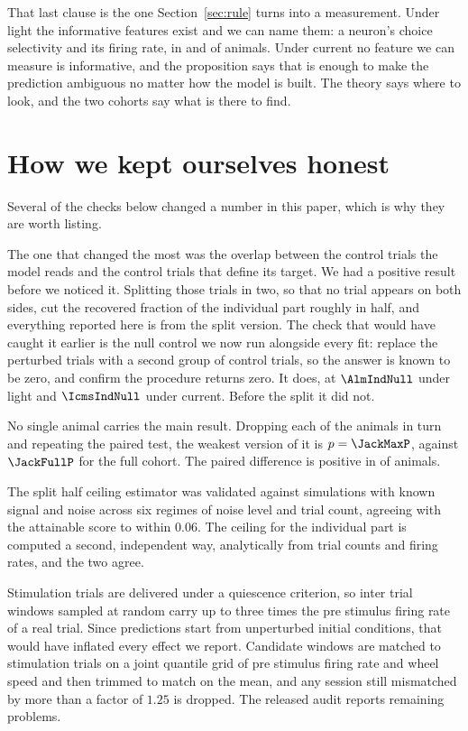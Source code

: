 \documentclass[11pt,letterpaper]{article}
\begin{document}
That last clause is the one Section~\ref{sec:rule} turns into a measurement. Under
light the informative features exist and we can name them: a neuron's choice
selectivity and its firing rate, in \RuleSelNeg{} and \RuleRateNeg{} of \RuleSelN{}
animals. Under current no feature we can measure is informative, and the proposition
says that is enough to make the prediction ambiguous no matter how the model is built.
The theory says where to look, and the two cohorts say what is there to find.

\section{How we kept ourselves honest}

Several of the checks below changed a number in this paper, which is why they are worth
listing.

The one that changed the most was the overlap between the control trials the model
reads and the control trials that define its target. We had a positive result before we
noticed it. Splitting those trials in two, so that no trial appears on both sides, cut
the recovered fraction of the individual part roughly in half, and everything reported
here is from the split version. The check that would have caught it earlier is the null
control we now run alongside every fit: replace the perturbed trials with a second group
of control trials, so the answer is known to be zero, and confirm the procedure returns
zero. It does, at $\AlmIndNull$ under light and $\IcmsIndNull$ under current. Before
the split it did not.

No single animal carries the main result. Dropping each of the \JackN{} animals in
turn and repeating the paired test, the weakest version of it is $p = \JackMaxP$,
against $\JackFullP$ for the full cohort. The paired difference is positive in
\JackPos{} of \JackN{} animals.

The split half ceiling estimator was validated against simulations with known signal
and noise across six regimes of noise level and trial count, agreeing with the
attainable score to within $0.06$. The ceiling for the individual part is computed a
second, independent way, analytically from trial counts and firing rates, and the two
agree.

Stimulation trials are delivered under a quiescence criterion, so inter trial windows
sampled at random carry up to three times the pre stimulus firing rate of a real trial.
Since predictions start from unperturbed initial conditions, that would have inflated
every effect we report. Candidate windows are matched to stimulation trials on a joint
quantile grid of pre stimulus firing rate and wheel speed and then trimmed to match on
the mean, and any session still mismatched by more than a factor of $1.25$ is dropped.
The released audit reports \NAuditProblems{} remaining problems.
\end{document}

